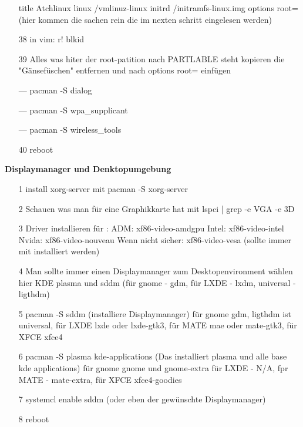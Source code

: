\documentclass[a4paper,12pt]{article}
\begin{document}
\begin{itemize}
		\subitem title Atchlinux
		\subitem linux /vmlinuz-linux
		\subitem initrd /initramfs-linux.img
		\subitem options root=(hier kommen die sachen rein die im nexten schritt eingelesen werden)
	\item[38] in vim:    r! blkid
	\item[39] Alles was hiter der root-patition nach PARTLABLE steht kopieren die "Gänsefüschen" entfernen und nach options root=   einfügen
	\item[---] pacman -S dialog
	\item[---] pacman -S wpa\_supplicant
	\item[---] pacman -S wireless\_tools
	\item[40] reboot 
\end{itemize}
	
	\clearpage
	\begin{LARGE}
		\begin{center}
			\textbf{Displaymanager und Denktopumgebung}
		\end{center}
	\end{LARGE}		
	
	\clearpage
	
	\begin{itemize}
		\item[1] install xorg-server mit pacman -S xorg-server
		\item[2] Schauen was man für eine Graphikkarte hat mit lspci | grep -e VGA -e 3D
		\item[3] Driver installieren für :
			\subitem ADM: xf86-video-amdgpu
			\subitem Intel: xf86-video-intel
			\subitem Nvida: xf86-video-nouveau
			\subitem Wenn nicht sicher: xf86-video-vesa (sollte immer mit installiert werden)
		\item[4] Man sollte immer einen Displaymanager zum Desktopenvironment wählen hier KDE plasma und sddm (für gnome - gdm, für LXDE - lxdm, universal - ligthdm) 
		\item[5] pacman -S sddm (installiere Displaymanager) für gnome gdm, ligthdm ist universal, für LXDE lxde oder lxde-gtk3, für MATE mae oder mate-gtk3, für XFCE xfce4
		\item[6] pacman -S plasma kde-applications (Das installiert plasma und alle base kde applications) für gnome gnome und gnome-extra für LXDE - N/A, fpr MATE - mate-extra, für XFCE xfce4-goodies
		\item[7] systemcl enable sddm (oder eben der gewünschte Displaymanager)
		\item[8] reboot
		
	\end{itemize}
	
	
	
\end{document}
